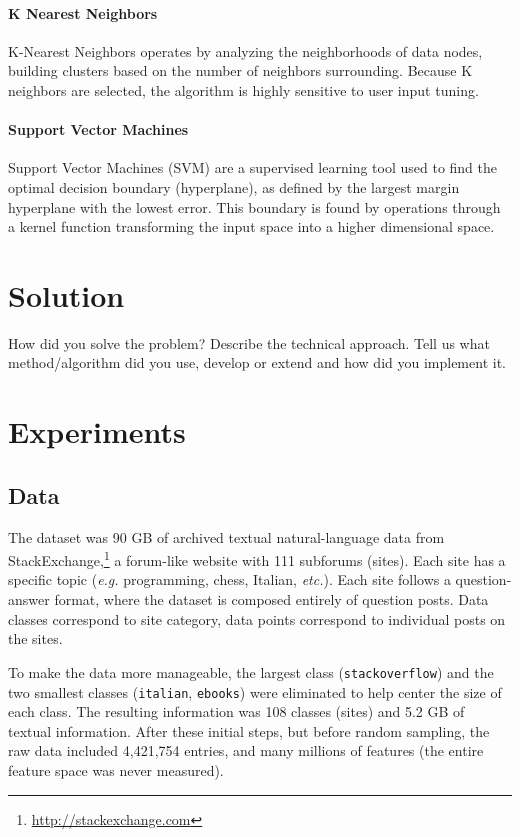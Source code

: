 \documentclass[letterpaper,10pt]{article}
\begin{document}
\paragraph{K Nearest Neighbors} K-Nearest Neighbors operates by analyzing
the neighborhoods of data nodes, building clusters based on the number of
neighbors surrounding. Because K neighbors are selected, the algorithm is
highly sensitive to user input tuning.

\paragraph{Support Vector Machines} Support Vector Machines
(SVM)\cite{vapnik1995} are a supervised learning tool used to find the
optimal decision boundary (hyperplane), as defined by the largest margin
hyperplane with the lowest error. This boundary is found by operations
through a kernel function transforming the input space into a higher
dimensional space.



\section{Solution}

{\color{red}
How did you solve the problem? Describe the technical approach. Tell us
what method/algorithm did you use, develop or extend and how did you
implement it.
}



\section{Experiments}


\subsection{Data}

The dataset was 90 GB of archived textual natural-language data from
StackExchange,\footnote{\url{http://stackexchange.com}} a forum-like
website with 111 subforums (sites). Each site has a specific topic
(\textit{e.g.} programming, chess, Italian, \textit{etc.}). Each site
follows a question-answer format, where the dataset is composed entirely of
question posts. Data classes correspond to site category, data points
correspond to individual posts on the sites.

To make the data more manageable, the largest class
(\texttt{stackoverflow}) and the two smallest classes (\texttt{italian},
\texttt{ebooks}) were eliminated to help center the size of each class.
The resulting information was 108 classes (sites) and 5.2 GB of textual
information. After these initial steps, but before random sampling, the raw
data included 4,421,754 entries, and many millions of features (the entire
feature space was never measured).
\end{document}
